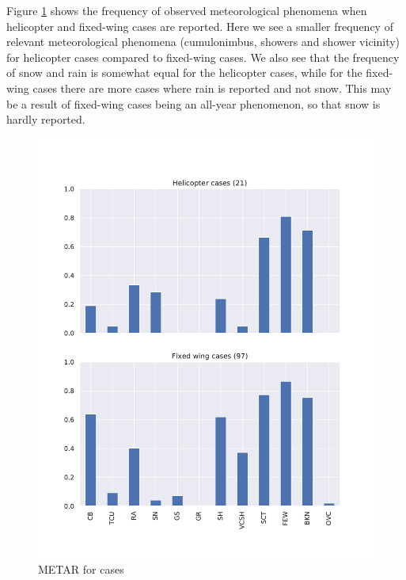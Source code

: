 Figure \ref{fig:metarcases} shows the frequency of observed meteorological phenomena when helicopter and fixed-wing cases are reported. Here we see a smaller frequency of relevant meteorological phenomena (cumulonimbus, showers and shower vicinity) for helicopter cases compared to fixed-wing cases. We also see that the frequency of snow and rain is somewhat equal for the helicopter cases, while for the fixed-wing cases there are more cases where rain is reported and not snow. This may be a result of fixed-wing cases being an all-year phenomenon, so that snow is hardly reported.

\begin{figure}
    \centering
    \includegraphics[width=\textwidth]{Figures/METARcases.pdf}
    \caption{METAR for cases}
    \label{fig:metarcases}
\end{figure}

